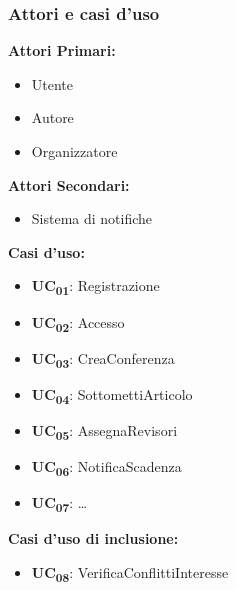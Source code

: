 \subsubsection{Attori e casi d'uso}
\begin{center}
\begin{minipage}[t]{0.5\textwidth}
\textbf{Attori Primari:}
\begin{itemize}
\item Utente
\item Autore
\item Organizzatore
\end{itemize}  
\end{minipage}%
\begin{minipage}[t]{0.5\textwidth}
\textbf{Attori Secondari:}
\begin{itemize}
\item Sistema di notifiche
\end{itemize}  
\end{minipage}%
\end{center}

\noindent
\textbf{Casi d'uso:}
\begin{itemize}
\item \textbf{UC\textsubscript{01}}: Registrazione
\item \textbf{UC\textsubscript{02}}: Accesso
\item \textbf{UC\textsubscript{03}}: CreaConferenza
\item \textbf{UC\textsubscript{04}}: SottomettiArticolo
\item \textbf{UC\textsubscript{05}}: AssegnaRevisori
\item \textbf{UC\textsubscript{06}}: NotificaScadenza
\item \textbf{UC\textsubscript{07}}: \dots
\end{itemize}

\textbf{Casi d'uso di inclusione:}
\begin{itemize}
\item \textbf{UC\textsubscript{08}}: VerificaConflittiInteresse
\end{itemize}

